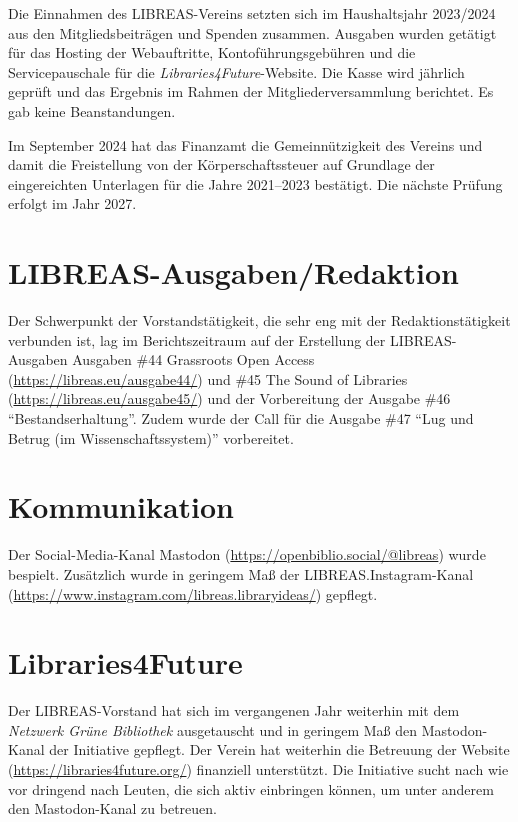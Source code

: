 \documentclass[a4paper,
fontsize=11pt,
oneside,
numbers=noperiodatend,
parskip=half-,
bibliography=totoc,
final
]{scrartcl}
\begin{document}
Die Einnahmen des LIBREAS-Vereins setzten sich im Haushaltsjahr
2023/2024 aus den Mitgliedsbeiträgen und Spenden zusammen. Ausgaben
wurden getätigt für das Hosting der Webauftritte, Kontoführungsgebühren
und die Servicepauschale für die \emph{Libraries4Future}-Website. Die
Kasse wird jährlich geprüft und das Ergebnis im Rahmen der
Mitgliederversammlung berichtet. Es gab keine Beanstandungen.

Im September 2024 hat das Finanzamt die Gemeinnützigkeit des Vereins und
damit die Freistellung von der Körperschaftssteuer auf Grundlage der
eingereichten Unterlagen für die Jahre 2021--2023 bestätigt. Die nächste
Prüfung erfolgt im Jahr 2027.

\section{LIBREAS-Ausgaben/Redaktion}\label{libreas-ausgabenredaktion}

Der Schwerpunkt der Vorstandstätigkeit, die sehr eng mit der
Redaktionstätigkeit verbunden ist, lag im Berichtszeitraum auf der
Erstellung der LIBREAS-Ausgaben Ausgaben \#44 Grassroots Open Access
(\url{https://libreas.eu/ausgabe44/}) und \#45 The Sound of Libraries
(\url{https://libreas.eu/ausgabe45/}) und der Vorbereitung der Ausgabe
\#46 \enquote{Bestandserhaltung}. Zudem wurde der Call für die Ausgabe
\#47 \enquote{Lug und Betrug (im Wissenschaftssystem)} vorbereitet.\\

\section{Kommunikation}\label{kommunikation}

Der Social-Media-Kanal Mastodon
(\url{https://openbiblio.social/@libreas}) wurde bespielt. Zusätzlich
wurde in geringem Maß der LIBREAS.Instagram-Kanal
(\url{https://www.instagram.com/libreas.libraryideas/}) gepflegt.

\section{Libraries4Future}\label{libraries4future}

Der LIBREAS-Vorstand hat sich im vergangenen Jahr weiterhin mit dem
\emph{Netzwerk Grüne Bibliothek} ausgetauscht und in geringem Maß den
Mastodon-Kanal der Initiative gepflegt. Der Verein hat weiterhin die
Betreuung der Website (\url{https://libraries4future.org/}) finanziell
unterstützt. Die Initiative sucht nach wie vor dringend nach Leuten, die
sich aktiv einbringen können, um unter anderem den Mastodon-Kanal zu
betreuen.

\end{document}
